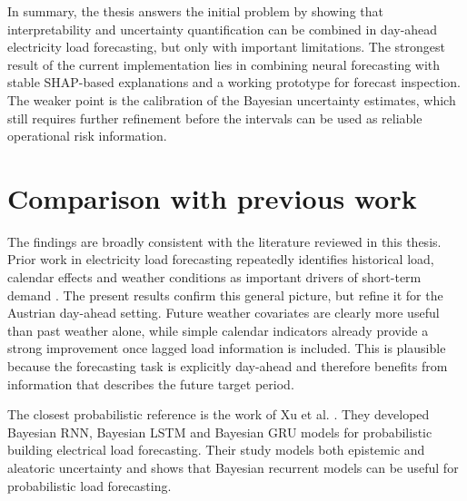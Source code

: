 \documentclass[Master,english,IEEE]{twbook}
\begin{document}
In summary, the thesis answers the initial problem by showing that interpretability and uncertainty quantification can be combined in day-ahead electricity load forecasting, but only with important limitations. The strongest result of the current implementation lies in combining neural forecasting with stable SHAP-based explanations and a working prototype for forecast inspection. The weaker point is the calibration of the Bayesian uncertainty estimates, which still requires further refinement before the intervals can be used as reliable operational risk information.


\section{Comparison with previous work}

The findings are broadly consistent with the literature reviewed in this thesis. Prior work in electricity load forecasting repeatedly identifies historical load, calendar effects and weather conditions as important drivers of short-term demand \cite{andriopoulosShortTermElectric2021,yaprakdalMultivariateTimeSeries2023,liPowerLoadForecasting2022}. The present results confirm this general picture, but refine it for the Austrian day-ahead setting. Future weather covariates are clearly more useful than past weather alone, while simple calendar indicators already provide a strong improvement once lagged load information is included. This is plausible because the forecasting task is explicitly day-ahead and therefore benefits from information that describes the future target period.

The closest probabilistic reference is the work of Xu et al. \cite{xuProbabilisticElectricalLoad2022}. They developed Bayesian RNN, Bayesian LSTM and Bayesian GRU models for probabilistic building electrical load forecasting. Their study models both epistemic and aleatoric uncertainty and shows that Bayesian recurrent models can be useful for probabilistic load forecasting. 
\end{document}
